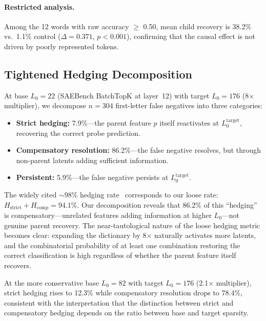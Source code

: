\documentclass{article}
\begin{document}
\paragraph{Restricted analysis.} Among the 12 words with raw accuracy $\geq$ 0.50, mean child recovery is 38.2\% vs.\ 1.1\% control ($\Delta = 0.371$, $p < 0.001$), confirming that the causal effect is not driven by poorly represented tokens.

\subsection{Tightened Hedging Decomposition}
\label{sec:hedging_results}

At base $L_0 = 22$ (SAEBench BatchTopK at layer~12) with target $L_0 = 176$ (8$\times$ multiplier), we decompose $n = 304$ first-letter false negatives into three categories:

\begin{itemize}
\item \textbf{Strict hedging:} 7.9\%---the parent feature $p$ itself reactivates at $L_0^{\text{target}}$, recovering the correct probe prediction.
\item \textbf{Compensatory resolution:} 86.2\%---the false negative resolves, but through non-parent latents adding sufficient information.
\item \textbf{Persistent:} 5.9\%---the false negative persists at $L_0^{\text{target}}$.
\end{itemize}

The widely cited ${\sim}$98\% hedging rate~\citep{chanin2025hedging} corresponds to our loose rate: $H_{\text{strict}} + H_{\text{comp}} = 94.1\%$. Our decomposition reveals that 86.2\% of this ``hedging'' is compensatory---unrelated features adding information at higher $L_0$---not genuine parent recovery. The near-tautological nature of the loose hedging metric becomes clear: expanding the dictionary by 8$\times$ naturally activates more latents, and the combinatorial probability of at least one combination restoring the correct classification is high regardless of whether the parent feature itself recovers.

At the more conservative base $L_0 = 82$ with target $L_0 = 176$ (2.1$\times$ multiplier), strict hedging rises to 12.3\% while compensatory resolution drops to 78.4\%, consistent with the interpretation that the distinction between strict and compensatory hedging depends on the ratio between base and target sparsity.
\end{document}
